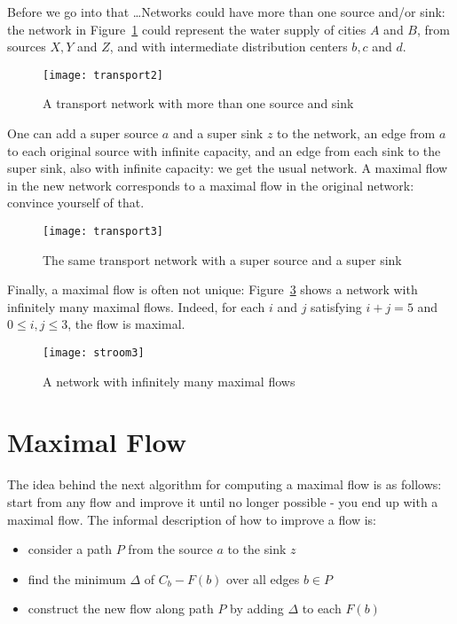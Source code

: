 Before we go into that \ldots Networks could have more than one source
and/or sink: the network in Figure~\ref{transport2} could represent
the water supply of cities $A$ and $B$, from sources $X,Y$ and $Z$,
and with intermediate distribution centers $b,c$ and $d$.

\begin{figure}[ht]
	\centering
	\texttt{[image: transport2]} %
	\caption{A transport network with more than one source and sink \label{transport2}}
\end{figure}

One can add a super source $a$ and a super sink $z$ to the network, an
edge from $a$ to each original source with infinite capacity, and an
edge from each sink to the super sink, also with infinite capacity: we
get the usual network. A maximal flow in the new network corresponds to a maximal flow in the
original network: convince yourself of that.

\begin{figure}[ht]
	\centering
	\texttt{[image: transport3]} %
	\caption{The same transport network with a super source and a
	super sink \label{transport3}}
\end{figure}

Finally, a maximal flow is often not unique: Figure~\ref{stroom3}
shows a network with infinitely many maximal flows. Indeed, for each
$i$ and $j$ satisfying $i+j = 5$ and $0 \leq i,j \leq 3$, the flow is
maximal.

\begin{figure}[ht]
	\centering
	\texttt{[image: stroom3]} %
	\caption{A network with infinitely many maximal flows\label{stroom3}}
\end{figure}


\section{Maximal Flow}

The idea behind the next algorithm for computing a maximal flow is as
follows: start from any flow and improve it until no longer possible -
you end up with a maximal flow. The informal description of how to
improve a flow is:
\begin{itemize}
\item
consider a path $P$ from the source $a$ to the sink $z$
\item
find the minimum $\Delta$ of $C_{b} - F(b)$ over all edges $b \in P$
\item
construct the new flow along path $P$ by adding $\Delta$ to each $F(b)$
\end{itemize}

